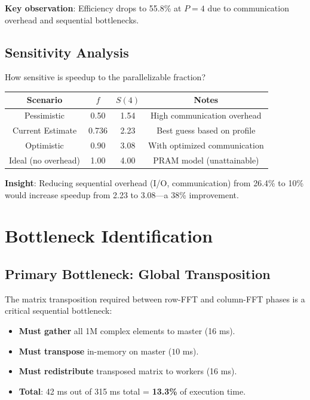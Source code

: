 \documentclass[11pt,a4paper]{article}
\begin{document}
\textbf{Key observation}: Efficiency drops to 55.8\% at $P=4$ due to communication overhead and sequential bottlenecks.

\subsection{Sensitivity Analysis}

How sensitive is speedup to the parallelizable fraction?

\begin{table}[h]
    \centering
    \begin{tabular}{cccc}
        \hline
        \textbf{Scenario} & $f$ & $S(4)$ & Notes \\
        \hline
        Pessimistic & 0.50 & 1.54 & High communication overhead \\
        Current Estimate & 0.736 & 2.23 & Best guess based on profile \\
        Optimistic & 0.90 & 3.08 & With optimized communication \\
        Ideal (no overhead) & 1.00 & 4.00 & PRAM model (unattainable) \\
        \hline
    \end{tabular}
\end{table}

\textbf{Insight}: Reducing sequential overhead (I/O, communication) from 26.4\% to 10\% would increase speedup from 2.23 to 3.08—a 38\% improvement.

\section{Bottleneck Identification}

\subsection{Primary Bottleneck: Global Transposition}

The matrix transposition required between row-FFT and column-FFT phases is a critical sequential bottleneck:

\begin{itemize}
    \item \textbf{Must gather} all 1M complex elements to master (16 ms).
    \item \textbf{Must transpose} in-memory on master ($10$ ms).
    \item \textbf{Must redistribute} transposed matrix to workers (16 ms).
    \item \textbf{Total}: 42 ms out of 315 ms total = \textbf{13.3\%} of execution time.
\end{itemize}
\end{document}
